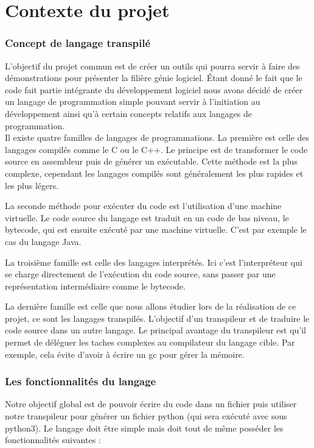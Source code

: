 \documentclass[a4paper]{article}%
\begin{document}
\part{Contexte du projet}

\section{Concept de langage transpilé}

L'objectif du projet commun est de créer un outils qui pourra servir à faire des
démonstrations pour présenter la filière génie logiciel. Étant donné le fait que
le code fait partie intégrante du développement logiciel nous avons décidé de
créer un langage de programmation simple pouvant servir à l'initiation au
développement ainsi qu'à certain concepts relatifs aux langages de
programmation.\\

Il existe quatre familles de langages de programmations. La première est celle
des langages compilés comme le C ou le C++. Le principe est de transformer le
code source en assembleur puis de générer un exécutable. Cette méthode est la
plus complexe, cependant les langages compilés sont généralement les plus
rapides et les plus légers.

La seconde méthode pour exécuter du code est l'utilisation d'une machine
virtuelle. Le code source du langage est traduit en un code de bas niveau, le
\gls{bytecode}, qui est ensuite exécuté par une machine virtuelle. C'est par exemple
le cas du langage Java.

La troisième famille est celle des langages interprétés. Ici c'est
l'interpréteur qui se charge directement de l'exécution du code source, sans
passer par une représentation intermédiaire comme le \gls{bytecode}.

La dernière famille est celle que nous allons étudier lors de la réalisation de
ce projet, ce sont les langages transpilés. L'objectif d'un transpileur et de
traduire le code source dans un autre langage. Le principal avantage du
transpileur est qu'il permet de déléguer les taches complexes au compilateur du
langage cible. Par exemple, cela évite d'avoir à écrire un \gls{gc} pour gérer
la mémoire.

\section{Les fonctionnalités du langage}

Notre objectif global est de pouvoir écrire du code dans un fichier puis
utiliser notre transpileur pour générer un fichier python (qui sera exécuté avec
sous python3). Le langage doit être simple mais doit tout de même posséder les
fonctionnalités suivantes :
\end{document}
